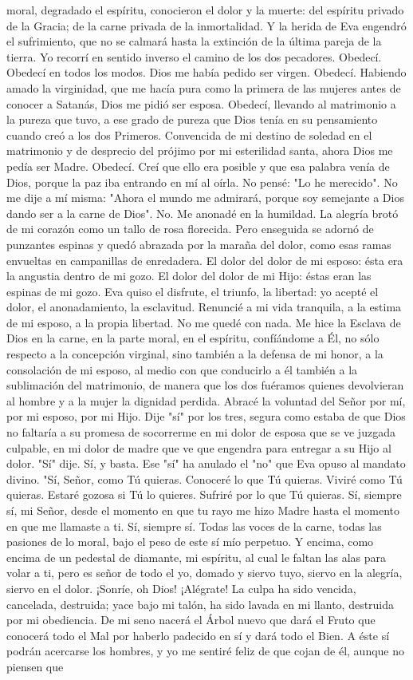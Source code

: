 \documentclass[12pt, twoside, openright]{book} %
\begin{document}
moral, degradado el espíritu, conocieron el dolor y la muerte: del espíritu privado de la Gracia; de la carne privada de la inmortalidad. Y la herida de Eva engendró el sufrimiento, que no se calmará hasta la extinción de la última pareja de la tierra. Yo recorrí en sentido inverso el camino de los dos pecadores. Obedecí. Obedecí en todos los modos. Dios me había pedido ser virgen. Obedecí. Habiendo amado la virginidad, que me hacía pura como la primera de las mujeres antes de conocer a Satanás, Dios me pidió ser esposa. Obedecí, llevando al matrimonio a la pureza que tuvo, a ese grado de pureza que Dios tenía en su pensamiento cuando creó a los dos Primeros. Convencida de mi destino de soledad en el matrimonio y de desprecio del prójimo por mi esterilidad santa, ahora Dios me pedía ser Madre. Obedecí. Creí que ello era posible y que esa palabra venía de Dios, porque la paz iba entrando en mí al oírla. No pensé: "Lo he merecido". No me dije a mí misma: "Ahora el mundo me admirará, porque soy semejante a Dios dando ser a la carne de Dios". No. Me anonadé en la humildad. La alegría brotó de mi corazón como un tallo de rosa florecida. Pero enseguida se adornó de punzantes espinas y quedó abrazada por la maraña del dolor, como esas ramas envueltas en campanillas de enredadera. El dolor del dolor de mi esposo: ésta era la angustia dentro de mi gozo. El dolor del dolor de mi Hijo: éstas eran las espinas de mi gozo. Eva quiso el disfrute, el triunfo, la libertad: yo acepté el dolor, el anonadamiento, la esclavitud. Renuncié a mi vida tranquila, a la estima de mi esposo, a la propia libertad. No me quedé con nada. Me hice la Esclava de Dios en la carne, en la parte moral, en el espíritu, confíándome a Él, no sólo respecto a la concepción virginal, sino también a la defensa de mi honor, a la consolación de mi esposo, al medio con que conducirlo a él también a la sublimación del matrimonio, de manera que los dos fuéramos quienes devolvieran al hombre y a la mujer la dignidad perdida. Abracé la voluntad del Señor por mí, por mi esposo, por mi Hijo. Dije "sí" por los tres, segura como estaba de que Dios no faltaría a su promesa de socorrerme en mi dolor de esposa que se ve juzgada culpable, en mi dolor de madre que ve que engendra para entregar a su Hijo al dolor. "Sí" dije. Sí, y basta. Ese "sí" ha anulado el "no" que Eva opuso al mandato divino. "Sí, Señor, como Tú quieras. Conoceré lo que Tú quieras. Viviré como Tú quieras. Estaré gozosa si Tú lo quieres. Sufriré por lo que Tú quieras. Sí, siempre sí, mi Señor, desde el momento en que tu rayo me hizo Madre hasta el momento en que me llamaste a ti. Sí, siempre sí. Todas las voces de la carne, todas las pasiones de lo moral, bajo el peso de este sí mío perpetuo. Y encima, como encima de un pedestal de diamante, mi espíritu, al cual le faltan las alas para volar a ti, pero es señor de todo el yo, domado y siervo tuyo, siervo en la alegría, siervo en el dolor. ¡Sonríe, oh Dios! ¡Alégrate! La culpa ha sido vencida, cancelada, destruida; yace bajo mi talón, ha sido lavada en mi llanto, destruida por mi obediencia. De mi seno nacerá el Árbol nuevo que dará el Fruto que conocerá todo el Mal por haberlo padecido en sí y dará todo el Bien. A éste sí podrán acercarse los hombres, y yo me sentiré feliz de que cojan de él, aunque no piensen que 
\end{document}
